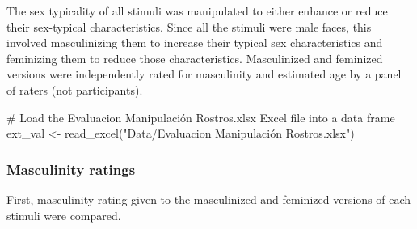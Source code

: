 \documentclass[
  bookmarksnumbered]{article}
\newenvironment{Shaded}{\begin{snugshade}}{\end{snugshade}}
\newcommand{\CommentTok}[1]{\textcolor[rgb]{0.50,0.62,0.50}{#1}}
\newcommand{\FunctionTok}[1]{\textcolor[rgb]{0.94,0.94,0.56}{#1}}
\newcommand{\NormalTok}[1]{\textcolor[rgb]{0.80,0.80,0.80}{#1}}
\newcommand{\OtherTok}[1]{\textcolor[rgb]{0.94,0.94,0.56}{#1}}
\newcommand{\StringTok}[1]{\textcolor[rgb]{0.80,0.58,0.58}{#1}}
\begin{document}
The sex typicality of all stimuli was manipulated to either enhance or reduce their sex-typical characteristics. Since all the stimuli were male faces, this involved masculinizing them to increase their typical sex characteristics and feminizing them to reduce those characteristics. Masculinized and feminized versions were independently rated for masculinity and estimated age by a panel of raters (not participants).

\begin{Shaded}
\begin{Highlighting}[]
\CommentTok{\# Load the \textquotesingle{}Evaluacion Manipulación Rostros.xlsx\textquotesingle{} Excel file into a data frame}
\NormalTok{ext\_val }\OtherTok{\textless{}{-}} \FunctionTok{read\_excel}\NormalTok{(}\StringTok{"Data/Evaluacion Manipulación Rostros.xlsx"}\NormalTok{)}
\end{Highlighting}
\end{Shaded}

\subsubsection{Masculinity ratings}\label{masculinity-ratings}

First, masculinity rating given to the masculinized and feminized versions of each stimuli were compared.
\end{document}
